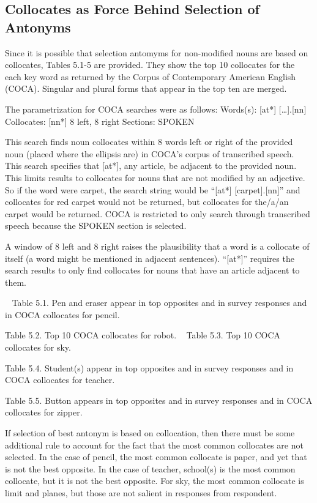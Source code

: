 \subsection {Collocates as Force Behind Selection of Antonyms} Since it is possible that selection antomyms for non-modified nouns are based on collocates, Tables 5.1-5 are provided.  They show the top 10 collocates for the each key word as returned by the Corpus of Contemporary American English (COCA).  Singular and plural forms that appear in the top ten are merged.  

The parametrization for COCA searches were as follows:
Words(s): 	[at*] […].[nn]
Collocates: 	[nn*] 8 left, 8 right
Sections: 	SPOKEN

This search finds noun collocates within 8 words left or right of the provided noun (placed where the ellipsis are) in COCA’s corpus of transcribed speech.  This search specifies that [at*], any article, be adjacent to the provided noun.  This limits results to collocates for nouns that are not modified by an adjective.  So if the word were carpet, the search string would be “[at*] [carpet].[nn]” and collocates for red carpet would not be returned, but collocates for the/a/an carpet would be returned.  COCA is restricted to only search through transcribed speech because the SPOKEN section is selected.

A window of 8 left and 8 right raises the plausibility that a word is a collocate of itself (a word might be mentioned in adjacent sentences).  “[at*]” requires the search results to only find collocates for nouns that have an article adjacent to them.  

 
	Table 5.1. Pen and eraser appear in top opposites and in survey responses and in COCA collocates for pencil.

	Table 5.2. Top 10 COCA collocates for robot.
	 
	Table 5.3. Top 10 COCA collocates for sky.

	Table 5.4. Student(s) appear in top opposites and in survey responses and in COCA collocates for teacher. 

	Table 5.5. Button appears in top opposites and in survey responses and in COCA collocates for zipper.

If selection of best antonym is based on collocation, then there must be some additional rule to account for the fact that the most common collocates are not selected.  In the case of pencil, the most common collocate is paper, and yet that is not the best opposite.  In the case of teacher, school(s) is the most common collocate, but it is not the best opposite.  For sky, the most common collocate is limit and planes, but those are not salient in responses from respondent.  

